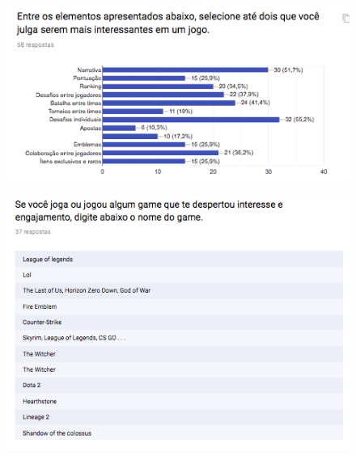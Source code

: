 \begin{apendicesenv}
\begin{figure}[h]
	\centering
	\includegraphics[keepaspectratio=true,scale=0.9]{figuras/r3.png}
\end{figure}

\begin{figure}[h]
	\centering
	\includegraphics[keepaspectratio=true,scale=1]{figuras/r4.png}
\end{figure}


\end{apendicesenv}
